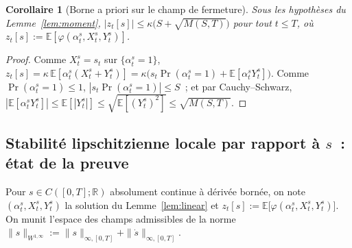 \documentclass[11pt,a4paper]{article}
\newcommand{\E}{\mathbb{E}}
\newcommand{\R}{\mathbb{R}}
\theoremstyle{plain}
\newtheorem{cor}[thm]{Corollaire}
\theoremstyle{definition}
\begin{document}
\begin{cor}[Borne a priori sur le champ de fermeture]
\label{cor:zbound}
Sous les hypoth\`eses du Lemme~\ref{lem:moment}, $\displaystyle|z_t[s]| \le \kappa\big(S+\sqrt{M(S,T)}\big)$ pour tout $t\le T$, o\`u $z_t[s]:=\E[\varphi(\alpha_t^s,X_t^s,Y_t^s)]$.
\end{cor}
\begin{proof}
Comme $X_t^s=s_t$ sur $\{\alpha_t^s=1\}$, $z_t[s]=\kappa\,\E[\alpha_t^s(X_t^s+Y_t^s)] = \kappa\big(s_t\Pr(\alpha_t^s=1)+\E[\alpha_t^sY_t^s]\big)$. Comme $\Pr(\alpha_t^s=1)\le1$, $|s_t\Pr(\alpha_t^s=1)|\le S$~; et par Cauchy--Schwarz, $|\E[\alpha_t^sY_t^s]|\le\E[|Y_t^s|]\le\sqrt{\E[(Y_t^s)^2]}\le\sqrt{M(S,T)}$.
\end{proof}

\subsection{Stabilit\'e lipschitzienne locale par rapport \`a $s$~: \'etat de la preuve}
\label{sec:lipschitz-status}

Pour $s\in C([0,T];\R)$ absolument continue \`a d\'eriv\'ee born\'ee, on note $(\alpha^s_t,X^s_t,Y^s_t)$ la solution du Lemme~\ref{lem:linear} et $z_t[s] := \E\big[\varphi(\alpha^s_t,X^s_t,Y^s_t)\big]$. On munit l'espace des champs admissibles de la norme $\|s\|_{W^{1,\infty}}:=\|s\|_{\infty,[0,T]}+\|\dot s\|_{\infty,[0,T]}$.
\end{document}
